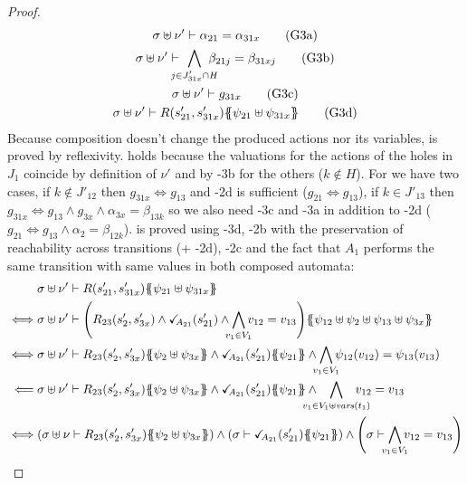 \documentclass{article}
\begin{document}
\begin{proof}
	\begin{gather}
		\sigma \uplus \nu' \vdash \alpha_{21} = \alpha_{31x} \goal{3a} \\
		\sigma \uplus \nu' \vdash \bigwedge_\subbox{j \in J'_{31x} \cap H} \beta_{21j} = \beta_{31xj} \goal{3b} \\
		\sigma \uplus \nu' \vdash g_{31x} \goal{3c} \\
		\sigma \uplus \nu' \vdash R\mpar{s'_{21}, s'_{31x}}\psubst{\psi_{21} \uplus \psi_{31x}} \goal{3d}
	\end{gather}
	Because composition doesn't change the produced actions nor its variables,  is proved by reflexivity.
	 holds because the valuations for the actions of the holes in \(J_1\) coincide by definition of \(\nu'\) and by \hyp{3b} for the others (\(k \notin H\)).
	For  we have two cases, if \(k \notin J'_{12}\) then \(g_{31x} \iff g_{13}\) and \hyp{2d} is sufficient (\(g_{21} \iff g_{13}\)), if \(k \in J'_{13}\) then \(g_{31x} \iff g_{13} \wedge g_{3x} \wedge \alpha_{3x} = \beta_{13k}\) so we also need \hyp{3c} and \hyp{3a} in addition to \hyp{2d} (\(g_{21} \iff g_{13} \wedge \alpha_2 = \beta_{12k}\)).
	 is proved using \hyp{3d}, \hyp{2b} with the preservation of reachability across transitions (+ \hyp{2d}), \hyp{2c} and the fact that \(A_1\) performs the same transition with same values in both composed automata:
	\begin{align*}
		& \sigma \uplus \nu' \vdash R\mpar{s'_{21}, s'_{31x}}\psubst{\psi_{21} \uplus \psi_{31x}} \\
		\iff & \sigma \uplus \nu' \vdash \mpar{R_{23}\mpar{s'_2, s'_{3x}} \wedge \reach{A_{21}}\mpar{s'_{21}} \wedge \bigwedge_\subbox{v_1 \in V_1} v_{12} = v_{13}}\psubst{\psi_{12} \uplus \psi_2 \uplus \psi_{13} \uplus \psi_{3x}} \\
		\iff & \sigma \uplus \nu' \vdash R_{23}\mpar{s'_2, s'_{3x}}\psubst{\psi_2 \uplus \psi_{3x}} \wedge \reach{A_{21}}\mpar{s'_{21}}\psubst{\psi_{21}} \wedge \bigwedge_\subbox{v_1 \in V_1} \psi_{12}\mpar{v_{12}} = \psi_{13}\mpar{v_{13}} \\
		\impliedby & \sigma \uplus \nu' \vdash R_{23}\mpar{s'_2, s'_{3x}}\psubst{\psi_2 \uplus \psi_{3x}} \wedge \reach{A_{21}}\mpar{s'_{21}}\psubst{\psi_{21}} \wedge \bigwedge_\subbox{v_1 \in V_1 \uplus \fvars{t_1}} v_{12} = v_{13} \\
		\iff & \mpar{\sigma \uplus \nu \vdash R_{23}\mpar{s'_2, s'_{3x}}\psubst{\psi_2 \uplus \psi_{3x}}} \wedge \mpar{\sigma \vdash \reach{A_{21}}\mpar{s'_{21}}\psubst{\psi_{21}}} \wedge \mpar{\sigma \vdash \bigwedge_\subbox{v_1 \in V_1} v_{12} = v_{13}}

\end{align*}
\end{proof}
\end{document}

